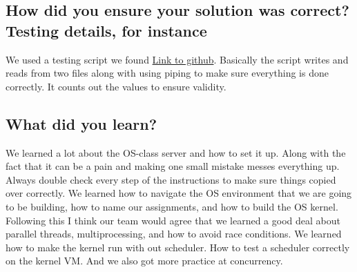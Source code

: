 \documentclass{article}
\begin{document}
\subsection*{How did you ensure your solution was correct? Testing details, for instance}
We used a testing script we found \href{https://github.com/fusion2004/cop4610/blob/master/lab4/test.sh}{Link to github}. Basically the script writes and reads from two files along with using piping to make sure everything is done correctly. It counts out the values to ensure validity. 
\subsection*{What did you learn?}
We learned a lot about the OS-class server and how to set it up. 
Along with the fact that it can be a pain and making one small mistake messes everything up. 
Always double check every step of the instructions to make sure things copied over correctly. 
We learned how to navigate the OS environment that we are going to be building, how to name our assignments, and how to build the OS kernel. 
Following this I think our team would agree that we learned a good deal about parallel threads, multiprocessing, and how to avoid race conditions.
We learned how to make the kernel run with out scheduler.
How to test a scheduler correctly on the kernel VM. 
And we also got more practice at concurrency. 
\end{document}
